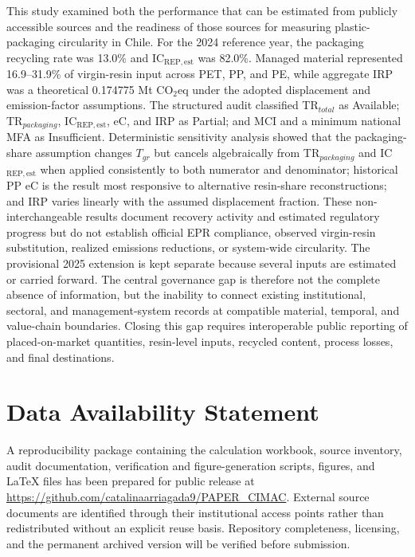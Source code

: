 \documentclass[review,10pt]{elsarticle}
\newcommand{\changepar}[1]{#1\par\medskip}
\begin{document}
\changepar{This study examined both the performance that can be estimated from publicly accessible sources and the readiness of those sources for measuring plastic-packaging circularity in Chile. For the 2024 reference year, the packaging recycling rate was 13.0\% and IC$_{\mathrm{REP,est}}$ was 82.0\%. Managed material represented 16.9--31.9\% of virgin-resin input across PET, PP, and PE, while aggregate IRP was a theoretical 0.174775 Mt CO$_2$eq under the adopted displacement and emission-factor assumptions. The structured audit classified TR$_{total}$ as Available; TR$_{packaging}$, IC$_{\mathrm{REP,est}}$, eC, and IRP as Partial; and MCI and a minimum national MFA as Insufficient. Deterministic sensitivity analysis showed that the packaging-share assumption changes $T_{gr}$ but cancels algebraically from TR$_{packaging}$ and IC$_{\mathrm{REP,est}}$ when applied consistently to both numerator and denominator; historical PP eC is the result most responsive to alternative resin-share reconstructions; and IRP varies linearly with the assumed displacement fraction. These non-interchangeable results document recovery activity and estimated regulatory progress but do not establish official EPR compliance, observed virgin-resin substitution, realized emissions reductions, or system-wide circularity. The provisional 2025 extension is kept separate because several inputs are estimated or carried forward. The central governance gap is therefore not the complete absence of information, but the inability to connect existing institutional, sectoral, and management-system records at compatible material, temporal, and value-chain boundaries. Closing this gap requires interoperable public reporting of placed-on-market quantities, resin-level inputs, recycled content, process losses, and final destinations.}

\section*{Data Availability Statement}

\changepar{A reproducibility package containing the calculation workbook, source inventory, audit documentation, verification and figure-generation scripts, figures, and LaTeX files has been prepared for public release at \url{https://github.com/catalinaarriagada9/PAPER_CIMAC}. External source documents are identified through their institutional access points rather than redistributed without an explicit reuse basis. Repository completeness, licensing, and the permanent archived version will be verified before submission.}
\end{document}

